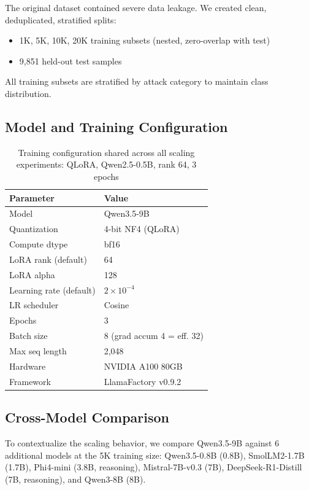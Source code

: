 \documentclass[review,3p]{elsarticle}
\begin{document}
The original dataset contained severe data leakage. We created clean, deduplicated, stratified splits:
\begin{itemize}
\item 1K, 5K, 10K, 20K training subsets (nested, zero-overlap with test)
\item 9,851 held-out test samples
\end{itemize}
All training subsets are stratified by attack category to maintain class distribution.

\subsection{Model and Training Configuration}

\begin{table}[!ht]
\centering
\caption{Training configuration shared across all scaling experiments: QLoRA, Qwen2.5-0.5B, rank 64, 3 epochs}
\label{tab:config}
\begin{tabular}{ll}
\toprule
\textbf{Parameter} & \textbf{Value} \\
\midrule
Model & Qwen3.5-9B \\
Quantization & 4-bit NF4 (QLoRA) \\
Compute dtype & bf16 \\
LoRA rank (default) & 64 \\
LoRA alpha & 128 \\
Learning rate (default) & $2 \times 10^{-4}$ \\
LR scheduler & Cosine \\
Epochs & 3 \\
Batch size & 8 (grad accum 4 = eff. 32) \\
Max seq length & 2,048 \\
Hardware & NVIDIA A100 80GB \\
Framework & LlamaFactory v0.9.2 \\
\bottomrule
\end{tabular}
\end{table}

\subsection{Cross-Model Comparison}
To contextualize the scaling behavior, we compare Qwen3.5-9B against 6 additional models at the 5K training size: Qwen3.5-0.8B (0.8B), SmolLM2-1.7B (1.7B), Phi4-mini (3.8B, reasoning), Mistral-7B-v0.3 (7B), DeepSeek-R1-Distill (7B, reasoning), and Qwen3-8B (8B).
\end{document}
